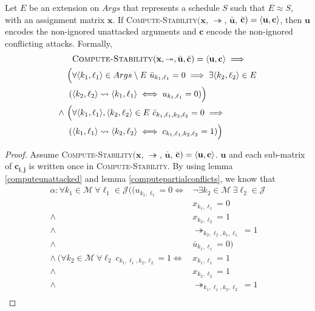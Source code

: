 \begin{theorem}
	\label{computestability}

	Let $E$ be an extension on $Args$ that represents a schedule $S$ such that $E\approx S$, with an assignment matrix $\mathbf{x}$.
	\linespace
	If \textsc{Compute-Stability}$(\mathbf{x}$, $\twoheadrightarrow$, $\bar{\mathbf{u}}$, $\bar{\mathbf{c}})=\langle{\mathbf{u}},{\mathbf{c}}\rangle$, then $\mathbf{u}$ encodes the non-ignored unattacked arguments and $\mathbf{c}$ encode the non-ignored conflicting attacks.
	\linespace
	Formally, 
	\begin{align*}
	&\textsc{Compute-Stability}(\mathbf{x}, \twoheadrightarrow, \bar{\mathbf{u}}, \bar{\mathbf{c}})=\pair{\mathbf{u}}{\mathbf{c}}\implies\\
	\Big(&\forall\pair{k_1}{\ell_1}\in Args\setminus E\ \bar{u}_{k_1,\ell_1}=0\implies\exists\pair{k_2}{\ell_2}\in E\\
	(&\pair{k_2}{\ell_2}\rightsquigarrow\pair{k_1}{\ell_1}\iff u_{k_1,\ell_1}=0)\Big)\\
	\land\ \Big(&\forall\pair{k_1}{\ell_1},\pair{k_2}{\ell_2}\in E\ \bar{c}_{k_1,\ell_1,k_2,\ell_2}=0\implies\\
	(&\pair{k_1}{\ell_1}\rightsquigarrow\pair{k_2}{\ell_2}\iff c_{k_1,\ell_1,k_2,\ell_2}=1)\Big)
	\end{align*}
	\begin{proof}
		Assume \textsc{Compute-Stability}$(\mathbf{x}$, $\twoheadrightarrow$, $\bar{\mathbf{u}}$, $\bar{\mathbf{c}})=\langle{\mathbf{u}},{\mathbf{c}}\rangle$. $\mathbf{u}$ and each sub-matrix of $\mathbf{c_{i,j}}$ is written once in \textsc{Compute-Stability}. By using lemma \ref{computeunattacked} and lemma \ref{computepartialconflicts}, we know that
		\begin{align*}
			\alpha: \forall k_1\in\mathcal{M}\ \forall\ell_1\in\mathcal{J}((u_{k_1,\ell_1}=0\iff&\neg\exists k_2\in\mathcal{M}\ \exists\ell_2\in\mathcal{J}\\
			&x_{k_1,\ell_1}=0\\
			\land\ &x_{k_2,\ell_2}=1\\
			\land\ &\twoheadrightarrow_{k_2,\ell_2,k_1,\ell_1}=1\\
			\land\ &\bar{u}_{k_1,\ell_1}=0)\\
			\land\ (\forall k_2\in\mathcal{M}\ \forall\ell_2\ c_{k_1,\ell_1,k_2,\ell_2}=1\iff&x_{k_1,\ell_1}=1\\
			\land\ &x_{k_2,\ell_2}=1\\
			\land\ &\twoheadrightarrow_{k_1,\ell_1,k_2,\ell_2}=1\\

\end{align*}
\end{proof}
\end{theorem}
